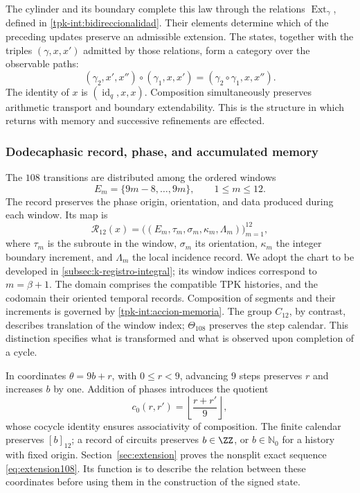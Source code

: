 The cylinder and its boundary complete this law through the relations
\(\operatorname{Ext}_\gamma\), defined in
\ref{tpk-int:bidireccionalidad}. Their elements determine which of
the preceding updates preserve an admissible extension.
The states, together with the triples \((\gamma,x,x')\) admitted by
those relations, form a category over the observable paths:
\[
 (\gamma_2,x',x'')\circ(\gamma_1,x,x')
     =(\gamma_2\circ\gamma_1,x,x'').
\]
The identity of \(x\) is \((\operatorname{id}_q,x,x)\).
Composition simultaneously preserves arithmetic transport and
boundary extendability. This is the structure in which
returns with memory and successive refinements are effected.

\subsubsection{Dodecaphasic record, phase, and accumulated memory}
\label{tpk-int:dodecafase}

The \(108\) transitions are distributed among the ordered windows
\[
 E_m=\{9m-8,\ldots,9m\},\qquad 1\leq m\leq12.
\]
The record preserves the phase origin, orientation, and data
produced during each window. Its map is
\[
 \mathcal R_{12}(x)=
 \bigl((E_m,\tau_m,\sigma_m,\kappa_m,\Lambda_m)\bigr)_{m=1}^{12},
\]
where \(\tau_m\) is the subroute in the window, \(\sigma_m\) its
orientation, \(\kappa_m\) the integer boundary increment, and
\(\Lambda_m\) the local incidence record. We adopt the chart
to be developed in \ref{subsec:k-registro-integral}; its window indices
correspond to \(m=\beta+1\).
The domain comprises the compatible TPK histories, and the codomain their
oriented temporal records. Composition of segments and their increments
is governed by \eqref{tpk-int:accion-memoria}. The group \(C_{12}\), by
contrast, describes translation of the window index; \(\Theta_{108}\) preserves
the step calendar. This distinction specifies what is transformed
and what is observed upon completion of a cycle.

In coordinates \(\theta=9b+r\), with \(0\leq r<9\), advancing
\(9\) steps preserves \(r\) and increases \(b\) by one.
Addition of phases introduces the quotient
\[
 c_0(r,r')=\left\lfloor\frac{r+r'}9\right\rfloor,
\]
whose cocycle identity ensures associativity of composition.
The finite calendar preserves \([b]_{12}\); a record of
circuits preserves \(b\in\ZZ\), or \(b\in\mathbb N_0\) for
a history with fixed origin. Section~\ref{sec:extension} proves
the nonsplit exact sequence \eqref{eq:extension108}. Its function is
to describe the relation between these coordinates before using them in the
construction of the signed state.

